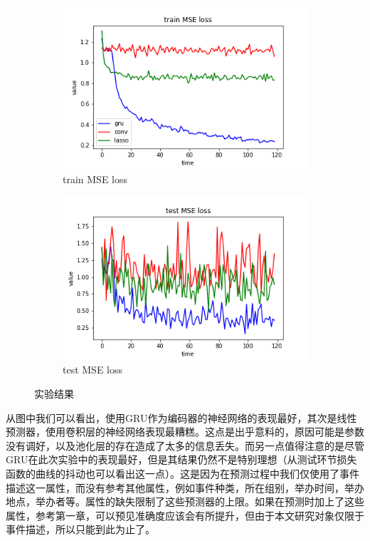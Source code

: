 \documentclass[12pt]{template}
\begin{document}
\begin{figure}[htbp]
	\centering
	\begin{subfigure}{.4\textwidth}
		\includegraphics[width=\textwidth]{trainloss.png}
		\caption{train MSE loss}
	\end{subfigure}
	\begin{subfigure}{.4\textwidth}
		\includegraphics[width=\textwidth]{testloss.png}
		\caption{test MSE loss}
	\end{subfigure}
    \caption{实验结果}
    \label{f24}
\end{figure}

从图中我们可以看出，使用GRU作为编码器的神经网络的表现最好，其次是线性预测器，使用卷积层的神经网络表现最糟糕。这点是出乎意料的，原因可能是参数没有调好，以及池化层的存在造成了太多的信息丢失。而另一点值得注意的是尽管GRU在此次实验中的表现最好，但是其结果仍然不是特别理想（从测试环节损失函数的曲线的抖动也可以看出这一点）。这是因为在预测过程中我们仅使用了事件描述这一属性，而没有参考其他属性，例如事件种类，所在组别，举办时间，举办地点，举办者等。属性的缺失限制了这些预测器的上限。如果在预测时加上了这些属性，参考第一章，可以预见准确度应该会有所提升，但由于本文研究对象仅限于事件描述，所以只能到此为止了。 
\end{document}
